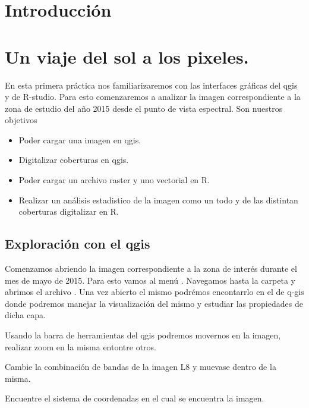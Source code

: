 \documentclass[a4paper]{article}
\begin{document}
\section*{Introducción}
\label{sec:intro}
 
\section{Un viaje del sol a los pixeles.}
\label{sec:fep}
 En esta primera práctica nos familiarizaremos con las interfaces gráficas del
 qgis y de R-studio. Para esto comenzaremos a analizar la imagen correspondiente
 a la zona de estudio del año 2015 desde el punto de vista espectral. Son
 nuestros objetivos

 \begin{itemize}
     \item Poder cargar una imagen en qgis.
     \item Digitalizar coberturas en qgis.
     \item Poder cargar un archivo raster y uno vectorial en R.
     \item Realizar un análisis estadistico de la imagen como un todo y de las
         distintan coberturas digitalizar en R.
 \end{itemize}
\subsection{Exploración con el qgis}
\label{sub:fep:qgis}

 Comenzamos abriendo la imagen  correspondiente a la zona de interés
 durante el mes de mayo de 2015. Para esto vamos al menú . Navegamos hasta la carpeta
  y abrimos el archivo
 . Una vez abierto el mismo podrémos encontarrlo en
 el  de q-gis donde podremos manejar la visualización del
 mismo y estudiar las propiedades de dicha capa.

 Usando la barra de herramientas del qgis podremos movernos en la imagen,
 realizar zoom en la misma entontre otros.

 \begin{act} 
     Cambie la combinación de bandas de la imagen L8 y muevase  dentro de la
     misma.
 \end{act}

 \begin{act}
     Encuentre el sistema de coordenadas en el cual se encuentra la imagen.
 \end{act}
 
\end{document}
